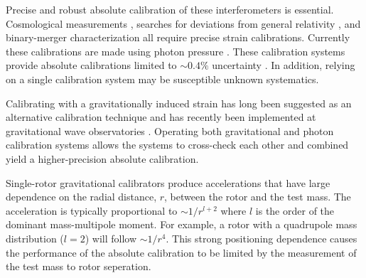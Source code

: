 \documentclass[superscriptaddress, twocolumn, prd]{revtex4-1}
\begin{document}
Precise and robust absolute calibration of these interferometers is essential. Cosmological measurements \cite{abbott2021gravitational, ligo2017gravitational, schutz1986determining}, searches for deviations from general relativity \cite{abbott2020tests}, and binary-merger characterization \cite{abbott2020population} all require precise strain calibrations. Currently these calibrations are made using photon pressure \cite{PCal}. These calibration systems provide absolute calibrations limited to $\sim0.4\%$ uncertainty \cite{Bhattacharjee_2020}. In addition, relying on a single calibration system may be susceptible unknown systematics.

%

Calibrating with a gravitationally induced strain has long been suggested as an alternative calibration technique \cite{hirakawa1980dynamical, kuroda1985experimental, mio1987experimental, astone1991evaluation, astone1998experimental, Matone_2007} and has recently been implemented at gravitational wave observatories \cite{Estevez_2018, estevez2021newtonian, PhysRevD.98.022005, ncal}. Operating both gravitational and photon calibration systems allows the systems to cross-check each other and combined yield a higher-precision absolute calibration.

Single-rotor gravitational calibrators \cite{Estevez_2018, estevez2021newtonian, PhysRevD.98.022005, ncal} produce accelerations that have large dependence on the radial distance, $r$, between the rotor and the test mass. The acceleration is typically proportional to $\sim1/r^{l+2}$ where $l$ is the order of the dominant mass-multipole moment. For example, a rotor with a quadrupole mass distribution ($l=2$) will follow $\sim1/r^4$. This strong positioning dependence causes the performance of the absolute calibration to be limited by the measurement of the test mass to rotor seperation.
\end{document}
